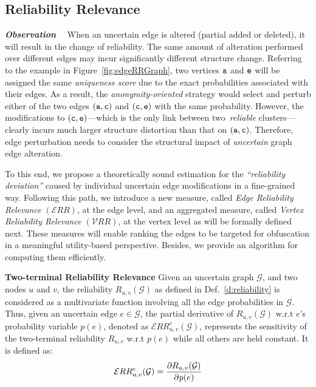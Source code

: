 \subsection{Reliability Relevance}

\textbf{\emph{Observation}}~~ 
When an uncertain edge is altered (partial added or deleted), it will result in the change of reliability. 
The same amount of alteration performed over different edges may incur significantly different structure change. 
Referring to the example in Figure~\ref{fig:edgeRRGraph}, two vertices $\tt{a}$ and $\tt{e}$ will be assigned the same {\em uniqueness score} due to the exact probabilities associated with their edges. 
As a result, the {\em anonymity-oriented} strategy would select and perturb either of the two edges $(\tt{a},\tt{c})$ and $(\tt{c},\tt{e})$ with the same probability. 
However, the modifications to $(\tt{c},\tt{e})$---which is the only link between two~\emph{reliable} clusters---clearly incurs much larger structure distortion than that on $(\tt{a},\tt{c})$. 
Therefore, edge perturbation needs to consider the structural impact of \emph{uncertain} graph edge alteration.



To this end, we propose a theoretically sound estimation for the {\em ``reliability deviation''} caused by individual uncertain edge modifications in a fine-grained way. 
Following this path, we introduce a new measure, called {\em Edge Reliability Relevance $(\mathcal{E}RR)$}, at the edge level, and an aggregated measure, called {\em Vertex Reliability Relevance $(\mathcal{V}RR)$}, at the vertex level as will be formally defined next. These measures will enable ranking the edges to be targeted for obfuscation in a meaningful utility-based perspective. Besides, we provide an algorithm for computing them efficiently. 


\begin{definition}
    \textbf{Two-terminal Reliability Relevance}
    Given an uncertain graph $\mathcal{G}$, and two nodes $u$ and $v$, 
    the  reliability $R_{u,v}(\mathcal{G})$ as defined in Def.~\ref{d:reliability} is considered as a multivariate function involving all the edge probabilities in $\mathcal{G}$.   
    Thus, given an uncertain edge $e \in \mathcal{G}$, the partial derivative of $R_{u,v}(\mathcal{G})$ w.r.t $e$'s probability 
    variable $p(e)$, denoted as $\mathcal{E}RR^{e}_{u,v}(\mathcal{G})$, represents the sensitivity of the 
    two-terminal reliability $R_{u,v}$ w.r.t $p(e)$ while all others are held constant. 
     It is defined as:  
\begin{equation*}
	\vspace{-0.5em}
    \mathcal{E}RR^{e}_{u,v}(\mathcal{G}) = \frac{\partial R_{u,v}(\mathcal{G})}{\partial \mathit{p}(e)}
    \vspace{-0.5em}
\end{equation*}
\end{definition}


